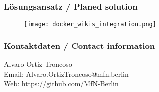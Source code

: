 \documentclass[13pt]{beamer}
\begin{document}
\begin{frame}
  \frametitle{Lösungsansatz / \textcolor{mfn_green}{Planed solution}}
  \begin{figure}
    \texttt{[image: docker\_wikis\_integration.png]}
  \end{figure}
\end{frame}

\begin{frame}
  \frametitle{Kontaktdaten / \textcolor{mfn_green}{Contact information}}
  \begin{center}
    Alvaro Ortiz-Troncoso \\
    \medskip
    Email: Alvaro.OrtizTroncoso@mfn.berlin \\    
    \medskip
    Web: https://github.com/MfN-Berlin
  \end{center}
\end{frame}
\end{document}
